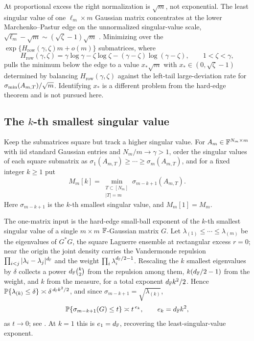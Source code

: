 \begin{remark}\label{rect:mp-edge}
At proportional excess the right normalization is \(\sqrt m\), not exponential.
The least singular value of one \(\ell_m\times m\) Gaussian matrix concentrates
at the lower Marchenko--Pastur edge on the unnormalized singular-value scale,
\(\sqrt{\ell_m}-\sqrt m\sim(\sqrt\zeta-1)\sqrt m\)
\cite{MarchenkoPastur1967,Forrester2010}.  Minimizing over the
\(\exp\{H_{\mathrm{row}}(\gamma,\zeta)m+o(m)\}\) submatrices, where
\[
  H_{\mathrm{row}}(\gamma,\zeta)
  =\gamma\log\gamma-\zeta\log\zeta-(\gamma-\zeta)\log(\gamma-\zeta),
  \qquad 1<\zeta<\gamma,
\]
pulls the minimum below the edge to a value \(x_*\sqrt m\) with
\(x_*\in(0,\sqrt\zeta-1)\) determined by balancing \(H_{\mathrm{row}}(\gamma,\zeta)\)
against the left-tail large-deviation rate for \(\sigma_{\min}(A_{m,T})/\sqrt m\).
Identifying \(x_*\) is a different problem from the hard-edge theorem and is not
pursued here.
\end{remark}

\subsection{The \texorpdfstring{\(k\)}{k}-th smallest singular value}

Keep the submatrices square but track a higher singular value.  For
\(A_m\in\mathbb{F}^{N_m\times m}\) with iid standard Gaussian entries and
\(N_m/m\to\gamma>1\), order the singular values of each square submatrix as
\(\sigma_1(A_{m,T})\ge\cdots\ge\sigma_m(A_{m,T})\), and for a fixed integer
\(k\ge1\) put
\[
  M_m[k]=\min_{\substack{T\subset[N_m]\\ |T|=m}}\sigma_{m-k+1}(A_{m,T}).
\]
Here \(\sigma_{m-k+1}\) is the \(k\)-th smallest singular value, and
\(M_m[1]=M_m\).

The one-matrix input is the hard-edge small-ball exponent of the \(k\)-th
smallest singular value of a single \(m\times m\) \(\mathbb{F}\)-Gaussian matrix \(G\).
Let \(\lambda_{(1)}\le\cdots\le\lambda_{(m)}\) be the eigenvalues of \(G^*G\), the
square Laguerre ensemble at rectangular excess \(r=0\); near the origin the
joint density carries the Vandermonde repulsion
\(\prod_{i<j}|\lambda_i-\lambda_j|^{d_{\mathbb{F}}}\) and the weight
\(\prod_i\lambda_i^{d_{\mathbb{F}}/2-1}\).  Rescaling the \(k\) smallest eigenvalues by
\(\delta\) collects a power \(d_{\mathbb{F}}\binom k2\) from the repulsion among them,
\(k(d_{\mathbb{F}}/2-1)\) from the weight, and \(k\) from the measure, for a total exponent
\(d_{\mathbb{F}} k^2/2\).  Hence \(\mathbb{P}\{\lambda_{(k)}\le\delta\}\asymp\delta^{\,d_{\mathbb{F}} k^2/2}\),
and since \(\sigma_{m-k+1}=\sqrt{\lambda_{(k)}}\),
\[
  \mathbb{P}\{\sigma_{m-k+1}(G)\le t\}\asymp t^{\,e_k},\qquad e_k=d_{\mathbb{F}} k^2,
\]
as \(t\to0\); see \cite{Forrester2010}.  At \(k=1\) this is \(e_1=d_{\mathbb{F}}\),
recovering the least-singular-value exponent.

